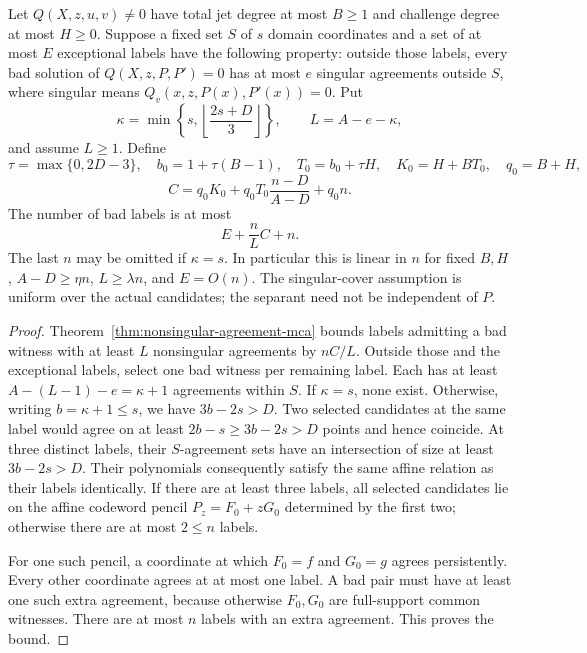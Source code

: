 \begin{theorem}
\label{thm:fixed-singular-cover}
Let $Q(X,z,u,v)\ne0$ have total jet degree at most $B\ge1$ and challenge
degree at most $H\ge0$. Suppose a fixed set $S$ of $s$ domain coordinates
and a set of at most $E$ exceptional labels have the following property:
outside those labels, every bad solution of $Q(X,z,P,P')=0$ has at most
$e$ singular agreements outside $S$, where singular means
$Q_v(x,z,P(x),P'(x))=0$. Put
\[
 \kappa=\min\left\{s,\left\lfloor\frac{2s+D}{3}\right\rfloor\right\},
 \qquad L=A-e-\kappa,
\]
and assume $L\ge1$. Define
\[
 \tau=\max\{0,2D-3\},\quad b_0=1+\tau(B-1),\quad
 T_0=b_0+\tau H,\quad K_0=H+BT_0,\quad q_0=B+H,
\]
\[
 C=q_0K_0+q_0T_0\frac{n-D}{A-D}+q_0n.
\]
The number of bad labels is at most
\begin{equation}\label{eq:singular-cover-bound}
 E+\frac nL C+n.
\end{equation}
The last $n$ may be omitted if $\kappa=s$. In particular this is linear
in $n$ for fixed $B,H$, $A-D\ge\eta n$, $L\ge\lambda n$, and $E=O(n)$.
The singular-cover assumption is uniform over the actual candidates;
the separant need not be independent of $P$.
\end{theorem}
\begin{proof}
Theorem~\ref{thm:nonsingular-agreement-mca} bounds labels admitting a bad
witness with at least $L$ nonsingular agreements by $nC/L$.
Outside those and the exceptional labels, select one bad witness per
remaining label. Each has at least
$A-(L-1)-e=\kappa+1$ agreements within $S$. If $\kappa=s$, none exist.
Otherwise, writing $b=\kappa+1\le s$, we have $3b-2s>D$.
Two selected candidates at the same label would agree on at least
$2b-s\ge3b-2s>D$ points and hence coincide. At three distinct labels,
their $S$-agreement sets have an intersection of size at least
$3b-2s>D$. Their polynomials consequently satisfy the same affine
relation as their labels identically. If there are at least three
labels, all selected candidates lie on the affine codeword pencil
$P_z=F_0+zG_0$ determined by the first two; otherwise there are at most
$2\le n$ labels.

For one such pencil, a coordinate at which $F_0=f$ and $G_0=g$ agrees
persistently. Every other coordinate agrees at at most one label.
A bad pair must have at least one such extra agreement, because otherwise
$F_0,G_0$ are full-support common witnesses. There are at most $n$ labels
with an extra agreement. This proves the bound.
\end{proof}


